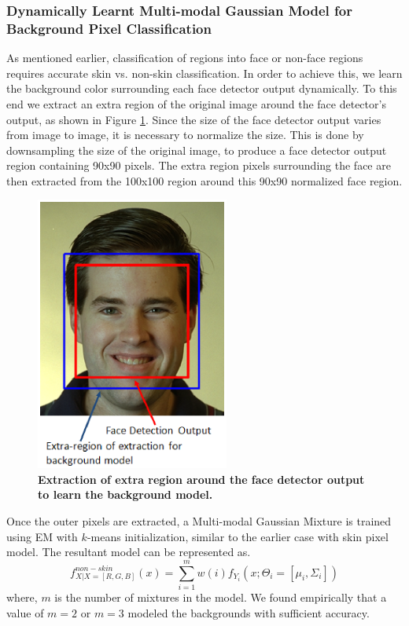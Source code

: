 \documentclass[times, 10pt,twocolumn]{article}
\begin{document}
\subsubsection{Dynamically Learnt Multi-modal Gaussian Model for
Background Pixel Classification}\label{DynamicModel} As mentioned
earlier, classification of regions into face or non-face regions
requires accurate skin vs. non-skin classification. In order to
achieve this, we learn the background color surrounding each face
detector output dynamically. To this end we extract an extra region
of the original image around the face detector's output, as shown in
Figure \ref{Fig:Extraregion}. Since the size of the face detector
output varies from image to image, it is necessary to normalize the
size. This is done by downsampling the size of the original image,
to produce a face detector output region containing 90x90 pixels.
The extra region pixels surrounding the face are then extracted from
the 100x100 region around this 90x90 normalized face region.
\vspace{-0.15in}
\begin{figure}[h]
\centering
\includegraphics[width=2.5in]{Figure5.eps}
\caption{{\bf {\selectfont Extraction of extra
region around the face detector output to learn the background
model.}}} \label{Fig:Extraregion}
\end{figure}

Once the outer pixels are extracted, a Multi-modal Gaussian Mixture
is trained using EM with $k$-means initialization, similar to the
earlier case with skin pixel model. The resultant model can be
represented as.
\begin{equation}
f^{non-skin}_{X|X=[R,G,B]}(x) =
\sum\limits_{i=1}^{m}w(i)f_{Y_i}\left(x;\Theta_i=[\mu_i,\Sigma_i]\right)
\end{equation}
where, $m$ is the number of mixtures in the model. We found
empirically that a value of $m=2$ or $m=3$ modeled the backgrounds
with sufficient accuracy.
\end{document}
